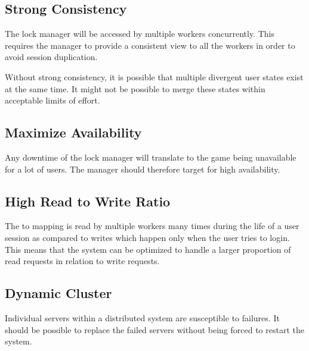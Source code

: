\subsection{Strong Consistency}


The lock manager will be accessed by multiple workers concurrently. This
requires the manager to provide a consistent view to all the workers in
order to avoid session duplication.

Without strong consistency, it is possible that multiple divergent user states
exist at the same time. It might not be possible to merge these states within
acceptable limits of effort.

\subsection{Maximize Availability}


Any downtime of the lock manager will translate to the game being unavailable
for a lot of users. The manager should therefore target for high availability.

\subsection{High Read to Write Ratio}
\label{section:req.read.write.ratio}


The  to  mapping is read by multiple workers many times
during the life
of a user session as compared to writes which happen only when the user tries
to login. This means that the system can be optimized to handle a larger
proportion of read requests in relation to write requests.

\subsection{Dynamic Cluster}
\label{section:req.dynamic.cluster}


Individual servers within a distributed system are susceptible to failures.
It should be possible to replace the failed servers without being forced
to restart the system.

